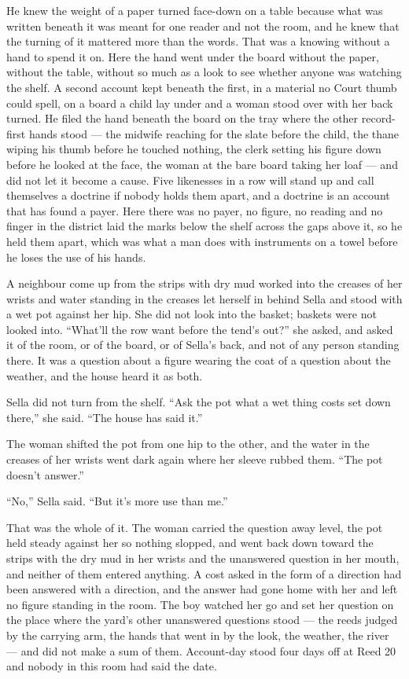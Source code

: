 He knew the weight of a paper turned face-down on a table because what was written beneath it was meant for one reader and not the room, and he knew that the turning of it mattered more than the words. That was a knowing without a hand to spend it on. Here the hand went under the board without the paper, without the table, without so much as a look to see whether anyone was watching the shelf. A second account kept beneath the first, in a material no Court thumb could spell, on a board a child lay under and a woman stood over with her back turned. He filed the hand beneath the board on the tray where the other record-first hands stood --- the midwife reaching for the slate before the child, the thane wiping his thumb before he touched nothing, the clerk setting his figure down before he looked at the face, the woman at the bare board taking her loaf --- and did not let it become a cause. Five likenesses in a row will stand up and call themselves a doctrine if nobody holds them apart, and a doctrine is an account that has found a payer. Here there was no payer, no figure, no reading and no finger in the district laid the marks below the shelf across the gaps above it, so he held them apart, which was what a man does with instruments on a towel before he loses the use of his hands.

\scenebreak

A neighbour come up from the strips with dry mud worked into the creases of her wrists and water standing in the creases let herself in behind Sella and stood with a wet pot against her hip. She did not look into the basket; baskets were not looked into. “What'll the row want before the tend's out?” she asked, and asked it of the room, or of the board, or of Sella's back, and not of any person standing there. It was a question about a figure wearing the coat of a question about the weather, and the house heard it as both.

Sella did not turn from the shelf. “Ask the pot what a wet thing costs set down there,” she said. “The house has said it.”

The woman shifted the pot from one hip to the other, and the water in the creases of her wrists went dark again where her sleeve rubbed them. “The pot doesn't answer.”

“No,” Sella said. “But it's more use than me.”

That was the whole of it. The woman carried the question away level, the pot held steady against her so nothing slopped, and went back down toward the strips with the dry mud in her wrists and the unanswered question in her mouth, and neither of them entered anything. A cost asked in the form of a direction had been answered with a direction, and the answer had gone home with her and left no figure standing in the room. The boy watched her go and set her question on the place where the yard's other unanswered questions stood --- the reeds judged by the carrying arm, the hands that went in by the look, the weather, the river --- and did not make a sum of them. Account-day stood four days off at Reed 20 and nobody in this room had said the date.


